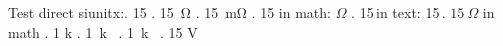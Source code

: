\documentclass{article}
\begin{document}
Test direct siunitx:. \SI{15}{\Omega} . \SI{15}{\ohm} . \SI{15}{\mohm} . \SI{15}{\Omega} in math: $\Omega$ . 15\,\Omega in text: 15\,\Omega {}. $\SI{15}{\Omega}$ in math . \SI{1 k}{\Omega} . \si{1 k\Omega} . \SI{1}{k\Omega} . 15 V \n
\end{document}
